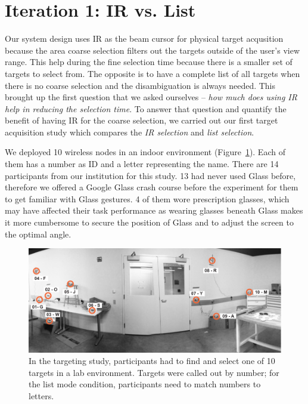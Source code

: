 
\section{Iteration 1: IR vs. List}
Our system design uses IR as the beam cursor for physical target acqusition because the area coarse selection filters out the targets outside of the user's view range. This help during the fine selection time because there is a smaller set of targets to select from. The opposite is to have a complete list of all targets when there is no coarse selection and the disambiguation is always needed. This brought up the first question that we asked ourselves -- {\em how much does using IR help in reducing the selection time}. To answer that question and quantify the benefit of having IR for the coarse selection, we carried out our first target acquisition study which compares the {\em IR selection} and {\em list selection}.  

We deployed 10 wireless nodes in an indoor environment (Figure~\ref{fig:targeting-study-layout}). Each of them has a number as ID and a letter representing the name. There are 14 participants from our institution for this study. 13 had never used Glass before, therefore we offered a Google Glass crash course before the experiment for them to get familiar with Glass gestures. 4 of them wore prescription glasses, which may have affected their task performance as wearing glasses beneath Glass makes it more cumbersome to secure the position of Glass and to adjust the screen to the optimal angle. 

\begin{figure}[t]
\centering
\includegraphics[width=1.0\columnwidth]{figures/targeting-study-layout.pdf}
\caption{In the targeting study, participants had to find and select one of 10 targets in a lab environment. Targets were called out by number; for the list mode condition, participants need to match numbers to letters.}
\label{fig:targeting-study-layout}
\end{figure}

